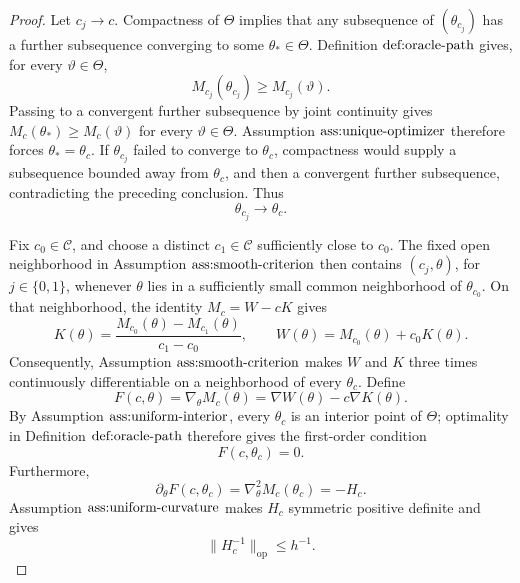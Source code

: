 \documentclass{article}
\begin{document}
\begin{proof}
Let \(c_j\to c\).  Compactness of \(\Theta\) implies that any subsequence of \((\theta_{c_j})\) has a further subsequence converging to some \(\theta_*\in\Theta\).  Definition \(\textnormal{def:oracle-path}\) gives, for every \(\vartheta\in\Theta\),
\[
 M_{c_j}(\theta_{c_j})\geq M_{c_j}(\vartheta).
\]
Passing to a convergent further subsequence by joint continuity gives \(M_c(\theta_*)\geq M_c(\vartheta)\) for every \(\vartheta\in\Theta\).  Assumption \(\textnormal{ass:unique-optimizer}\) therefore forces \(\theta_*=\theta_c\).  If \(\theta_{c_j}\) failed to converge to \(\theta_c\), compactness would supply a subsequence bounded away from \(\theta_c\), and then a convergent further subsequence, contradicting the preceding conclusion.  Thus
\[
 \theta_{c_j}\longrightarrow\theta_c.                         \tag{4}
\]

Fix \(c_0\in\mathcal C\), and choose a distinct \(c_1\in\mathcal C\) sufficiently close to \(c_0\).  The fixed open neighborhood in Assumption \(\textnormal{ass:smooth-criterion}\) then contains \((c_j,\theta)\), for \(j\in\{0,1\}\), whenever \(\theta\) lies in a sufficiently small common neighborhood of \(\theta_{c_0}\).  On that neighborhood, the identity \(M_c=W-cK\) gives
\[
 K(\theta)=\frac{M_{c_0}(\theta)-M_{c_1}(\theta)}{c_1-c_0},
 \qquad
 W(\theta)=M_{c_0}(\theta)+c_0K(\theta).                       \tag{5}
\]
Consequently, Assumption \(\textnormal{ass:smooth-criterion}\) makes \(W\) and \(K\) three times continuously differentiable on a neighborhood of every \(\theta_c\).  Define
\[
 F(c,\theta)=\nabla_\theta M_c(\theta)
             =\nabla W(\theta)-c\nabla K(\theta).
\]
By Assumption \(\textnormal{ass:uniform-interior}\), every \(\theta_c\) is an interior point of \(\Theta\); optimality in Definition \(\textnormal{def:oracle-path}\) therefore gives the first-order condition
\[
 F(c,\theta_c)=0.                                               \tag{6}
\]
Furthermore,
\[
 \partial_\theta F(c,\theta_c)
 =\nabla_\theta^2M_c(\theta_c)=-H_c.                              \tag{7}
\]
Assumption \(\textnormal{ass:uniform-curvature}\) makes \(H_c\) symmetric positive definite and gives
\[
 \|H_c^{-1}\|_{\mathrm{op}}\leq h^{-1}.                       \tag{8}
\]


\end{proof}
\end{document}
